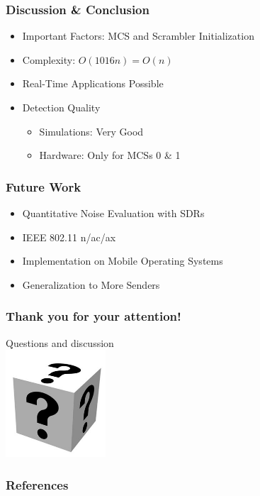 \documentclass[accentcolor=tud8b,colorbacktitle]{tudbeamer}
\begin{document}
\begin{frame}
\frametitle{Discussion \& Conclusion}
\begin{itemize}
	\setlength\itemsep{1em}
	\item Important Factors: MCS and Scrambler Initialization
	\item Complexity: $ O(1016n) = O(n) $
	\item Real-Time Applications Possible
	\item Detection Quality
	\begin{itemize}
		\setlength\itemsep{1em}
		\vspace{1em}
		\item Simulations: Very Good
		\item Hardware: Only for MCSs 0 \& 1
	\end{itemize}
\end{itemize}
\end{frame}

	
\begin{frame}
\frametitle{Future Work}
\begin{itemize}
	\setlength\itemsep{1em}
	\item Quantitative Noise Evaluation with SDRs
	\item IEEE 802.11 n/ac/ax
	\item Implementation on Mobile Operating Systems
	\item Generalization to More Senders
\end{itemize}
\end{frame}


\begin{frame}
\frametitle{Thank you for your attention!}
\begin{center}
	\huge Questions and discussion\\
	\vspace{0,6cm}
	\includegraphics[height=4cm]{assets/faq}
\end{center}
\end{frame}


\begin{frame}[allowframebreaks]
\frametitle{References}


\end{frame}
\end{document}
